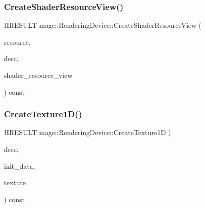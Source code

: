 \hypertarget{classmage_1_1_rendering_device_ae8594165ed730bf3decc1d4415147173}{}\label{classmage_1_1_rendering_device_ae8594165ed730bf3decc1d4415147173} 
\subsubsection{\texorpdfstring{Create\+Shader\+Resource\+View()}{CreateShaderResourceView()}}
{\footnotesize\ttfamily H\+R\+E\+S\+U\+LT mage\+::\+Rendering\+Device\+::\+Create\+Shader\+Resource\+View (\begin{DoxyParamCaption}\item[{I\+D3\+D11\+Resource $\ast$}]{resource,  }\item[{const D3\+D11\+\_\+\+S\+H\+A\+D\+E\+R\+\_\+\+R\+E\+S\+O\+U\+R\+C\+E\+\_\+\+V\+I\+E\+W\+\_\+\+D\+E\+SC $\ast$}]{desc,  }\item[{I\+D3\+D11\+Shader\+Resource\+View $\ast$$\ast$}]{shader\+\_\+resource\+\_\+view }\end{DoxyParamCaption}) const}

\hypertarget{classmage_1_1_rendering_device_a7e1260432187f6a1c50651f1839d0736}{}\label{classmage_1_1_rendering_device_a7e1260432187f6a1c50651f1839d0736} 
\subsubsection{\texorpdfstring{Create\+Texture1\+D()}{CreateTexture1D()}}
{\footnotesize\ttfamily H\+R\+E\+S\+U\+LT mage\+::\+Rendering\+Device\+::\+Create\+Texture1D (\begin{DoxyParamCaption}\item[{const D3\+D11\+\_\+\+T\+E\+X\+T\+U\+R\+E1\+D\+\_\+\+D\+E\+SC $\ast$}]{desc,  }\item[{const D3\+D11\+\_\+\+S\+U\+B\+R\+E\+S\+O\+U\+R\+C\+E\+\_\+\+D\+A\+TA $\ast$}]{init\+\_\+data,  }\item[{I\+D3\+D11\+Texture1D $\ast$$\ast$}]{texture }\end{DoxyParamCaption}) const}

\hypertarget{classmage_1_1_rendering_device_af4b0fee01c9b70dc769feff9b295738f}{}\label{classmage_1_1_rendering_device_af4b0fee01c9b70dc769feff9b295738f} 
